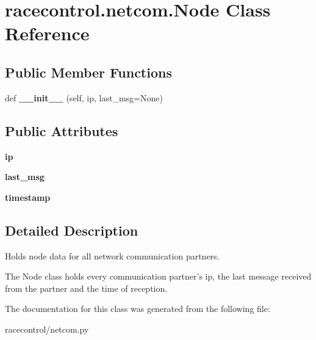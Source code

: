 \hypertarget{classracecontrol_1_1netcom_1_1Node}{}\section{racecontrol.\+netcom.\+Node Class Reference}
\label{classracecontrol_1_1netcom_1_1Node}
\subsection*{Public Member Functions}
\begin{DoxyCompactItemize}
\item 
def {\bfseries \+\_\+\+\_\+init\+\_\+\+\_\+} (self, ip, last\+\_\+msg=None)\hypertarget{classracecontrol_1_1netcom_1_1Node_ab4657c078f6072dd8c969deb02fc38b4}{}\label{classracecontrol_1_1netcom_1_1Node_ab4657c078f6072dd8c969deb02fc38b4}

\end{DoxyCompactItemize}
\subsection*{Public Attributes}
\begin{DoxyCompactItemize}
\item 
{\bfseries ip}\hypertarget{classracecontrol_1_1netcom_1_1Node_abdff7afa445316fee0d5654d7afb1807}{}\label{classracecontrol_1_1netcom_1_1Node_abdff7afa445316fee0d5654d7afb1807}

\item 
{\bfseries last\+\_\+msg}\hypertarget{classracecontrol_1_1netcom_1_1Node_a94713033f5b908feedd0c8916983e3b5}{}\label{classracecontrol_1_1netcom_1_1Node_a94713033f5b908feedd0c8916983e3b5}

\item 
{\bfseries timestamp}\hypertarget{classracecontrol_1_1netcom_1_1Node_a5c936ec6a989b43b28b349adbca9225e}{}\label{classracecontrol_1_1netcom_1_1Node_a5c936ec6a989b43b28b349adbca9225e}

\end{DoxyCompactItemize}


\subsection{Detailed Description}
\begin{DoxyVerb}Holds node data for all network communication partners.

The Node class holds every communication partner's ip, the last message
received from the partner and the time of reception.
\end{DoxyVerb}
 

The documentation for this class was generated from the following file\+:\begin{DoxyCompactItemize}
\item 
racecontrol/netcom.\+py\end{DoxyCompactItemize}
